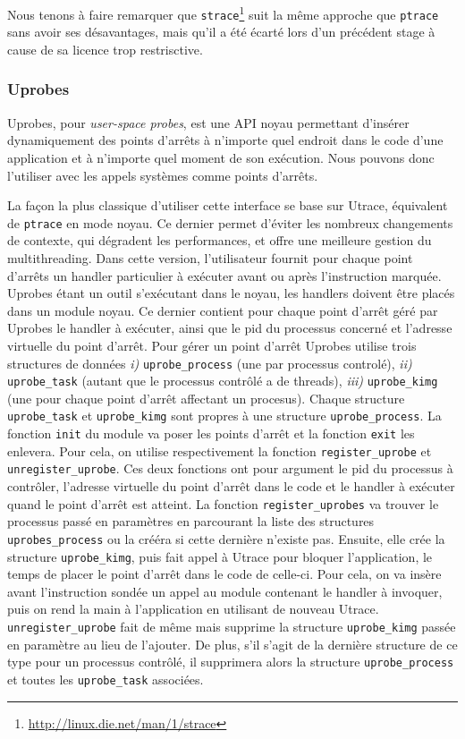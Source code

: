 Nous tenons à faire remarquer que \texttt{strace}\footnote{\url{http://linux.die.net/man/1/strace}} suit la même approche que \texttt{ptrace} sans avoir ses désavantages, mais qu'il a été écarté lors d'un précédent stage à cause de sa licence trop restrisctive.

\subsubsection{Uprobes}

Uprobes\citep{AS:Interception, MARION:Interception}, pour \textit{user-space
  probes}, est une API noyau permettant d'insérer dynamiquement des points
d'arrêts à n'importe quel endroit dans le code d'une application et à n'importe
quel moment de son exécution. Nous pouvons donc l'utiliser avec les appels
systèmes comme points d'arrêts.

La façon la plus classique d'utiliser cette interface se base sur Utrace,
équivalent de \texttt{ptrace} en mode noyau. Ce dernier permet d'éviter les
nombreux changements de contexte, qui dégradent les performances, et offre une
meilleure gestion du multithreading. Dans cette version, l'utilisateur fournit
pour chaque point d'arrêts un handler particulier à exécuter avant ou après
l’instruction marquée. Uprobes étant un outil s'exécutant dans le noyau, les
handlers doivent être placés dans un module noyau. Ce dernier contient pour
chaque point d'arrêt géré par Uprobes le handler à exécuter, ainsi que le pid du
processus concerné et l'adresse virtuelle du point d'arrêt. Pour gérer un point
d'arrêt Uprobes utilise trois structures de
données \textit{i)} \texttt{uprobe\_process} (une par processus controlé),
\textit{ii)} \texttt{uprobe\_task} (autant que le processus contrôlé a de
threads), \textit{iii)} \texttt{uprobe\_kimg} (une pour chaque point d'arrêt
affectant un procesus). Chaque structure \texttt{uprobe\_task} et
\texttt{uprobe\_kimg} sont propres à une structure \texttt{uprobe\_process}. La
fonction \texttt{init} du module va poser les points d'arrêt et la fonction
\texttt{exit} les enlevera. Pour cela, on utilise respectivement la fonction
\texttt{register\_uprobe} et \texttt{unregister\_uprobe}. Ces deux fonctions ont
pour argument le pid du processus à contrôler, l'adresse virtuelle du point
d'arrêt dans le code et le handler à exécuter quand le point d'arrêt est
atteint. La fonction \texttt{register\_uprobes} va trouver le processus passé en
paramètres en parcourant la liste des structures \texttt{uprobes\_process} ou la
crééra si cette dernière n'existe pas. Ensuite, elle crée la structure
\texttt{uprobe\_kimg}, puis fait appel à Utrace pour bloquer l'application, le
temps de placer le point d'arrêt dans le code de celle-ci. Pour cela, on va
insère avant l'instruction sondée un appel au module contenant le handler à
invoquer, puis on rend la main à l'application en utilisant de nouveau
Utrace. \texttt{unregister\_uprobe} fait de même mais supprime la structure
\texttt{uprobe\_kimg} passée en paramètre au lieu de l'ajouter. De plus, s'il
s'agit de la dernière structure de ce type pour un processus contrôlé, il
supprimera alors la structure \texttt{uprobe\_process} et toutes les
\texttt{uprobe\_task} associées.

